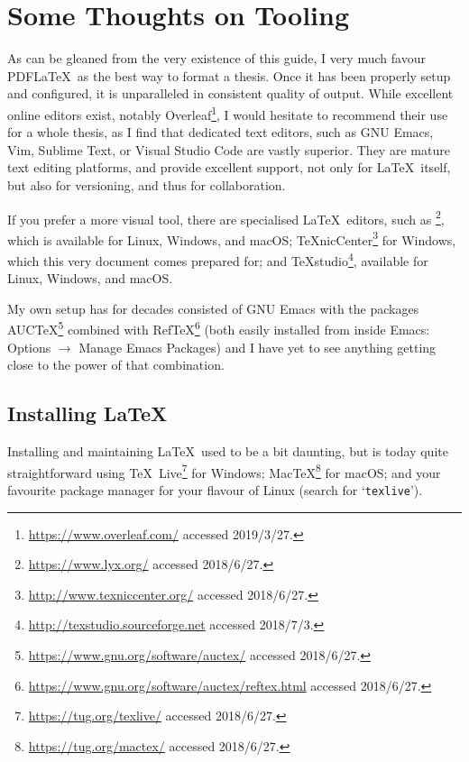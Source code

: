 
\chapter*{Some Thoughts on Tooling}
\label{cha:some-thoughts-tool}


As can be gleaned from the very existence of this guide, I very much favour PDF\LaTeX\ as the best way to format a thesis.
Once it has been properly setup and configured, it is unparalleled in consistent quality of output.
While excellent online editors exist, notably Overleaf\footnote{\url{https://www.overleaf.com/} accessed 2019/3/27.}, I would hesitate to recommend their use for a whole thesis, as I find that dedicated text editors, such as GNU Emacs, Vim, Sublime Text, or Visual Studio Code are vastly superior.
They are mature text editing platforms, and provide excellent support, not only for \LaTeX\ itself, but also for versioning, and thus for collaboration.

If you prefer a more visual tool, there are specialised \LaTeX\ editors, such as  \mLyX\footnote{\url{https://www.lyx.org/} accessed 2018/6/27.}, which is available for Linux, Windows, and macOS; \TeX nicCenter\footnote{\url{http://www.texniccenter.org/} accessed 2018/6/27.} for Windows, which this very document comes prepared for; and \TeX studio\footnote{\url{http://texstudio.sourceforge.net} accessed 2018/7/3.}, available for Linux, Windows, and macOS.

My own setup has for decades consisted of GNU Emacs with the packages AUC\TeX\footnote{\url{https://www.gnu.org/software/auctex/} accessed 2018/6/27.} combined with Ref\TeX\footnote{\url{https://www.gnu.org/software/auctex/reftex.html} accessed 2018/6/27.} (both easily installed from inside Emacs: Options $\rightarrow$ Manage Emacs Packages) and I have yet to see anything getting close to the power of that combination.

\section*{Installing \LaTeX}
\label{sec:installing-latex}

Installing and maintaining \LaTeX\ used to be a bit daunting, but is today quite straightforward using \TeX\ Live\footnote{\url{https://tug.org/texlive/} accessed 2018/6/27.} for Windows; Mac\negthinspace\TeX\footnote{\url{https://tug.org/mactex/} accessed 2018/6/27.} for mac\-OS; and your favourite package manager for your flavour of Linux (search for `\texttt{texlive}').


